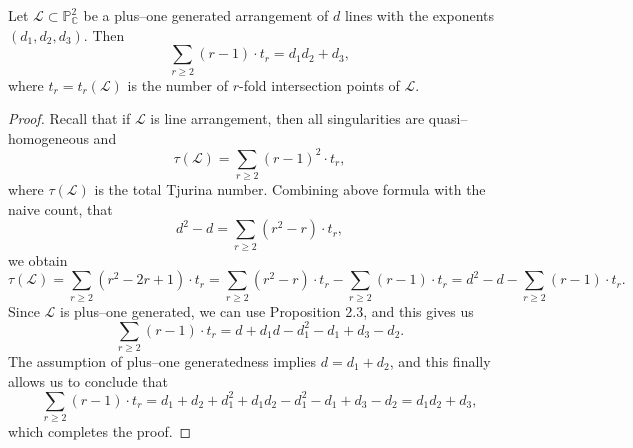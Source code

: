 \documentclass[10pt,a4paper]{amsart}
\begin{document}
\begin{thm}
\label{comeq}
     Let $\mathcal{L} \subset \mathbb{P}^{2}_{\mathbb{C}}$ be a plus--one generated arrangement of $d$ lines with the exponents $(d_1, d_2, d_3)$. Then
     $$\sum_{r\geq2}(r-1)\cdot t_r=d_1 d_2+d_3,$$
where $t_r = t_{r}(\mathcal{L})$ is the number of $r$-fold intersection points of $\mathcal{L}$.
\end{thm}

\begin{proof}
    Recall that if $\mathcal{L}$ is line arrangement, then all singularities are quasi--homogeneous and $$\tau(\mathcal{L})=\sum_{r\geq 2}{(r-1)^2\cdot t_r},$$
    where $\tau(\mathcal{L})$ is the total Tjurina number.
    Combining above formula with the naive count, that 
    $$d^2-d=\sum_{r\geq 2}{(r^2-r)\cdot t_r},$$
    we obtain
    $$\tau(\mathcal{L})=\sum_{r\geq 2}(r^2-2r+1)\cdot t_r=\sum_{r\geq 2}(r^2-r)\cdot t_r-\sum_{r\geq 2}(r-1)\cdot t_r=d^2-d-\sum_{r\geq 2}(r-1)\cdot t_r.$$
    Since $\mathcal{L}$ is plus--one generated, we can use Proposition 2.3, and this gives us
    $$\sum_{r\geq 2}(r-1)\cdot t_r=d+d_1d-d_1^2-d_1+d_3-d_2.$$
    The assumption of plus--one generatedness implies $d=d_1+d_2$, and this finally allows us to conclude that 
    $$\sum_{r\geq 2}(r-1)\cdot t_r=d_1+d_2+d_1^2+d_1d_2-d_1^2-d_1+d_3-d_2=d_1d_2+d_3,$$
    which completes the proof.
    

\end{proof}
\end{document}
